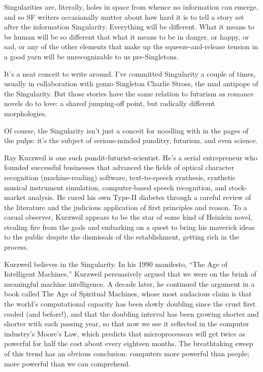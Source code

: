 Singularities are, literally, holes in space from whence no
information can emerge, and so SF writers occasionally mutter about
how hard it is to tell a story set after the information
Singularity. Everything will be different. What it means to be
human will be so different that what it means to be in danger, or
happy, or sad, or any of the other elements that make up the
squeeze-and-release tension in a good yarn will be unrecognizable
to us pre-Singletons.

It's a neat conceit to write around. I've committed Singularity a
couple of times, usually in collaboration with gonzo Singleton
Charlie Stross, the mad antipope of the Singularity. But those
stories have the same relation to futurism as romance novels do to
love: a shared jumping-off point, but radically different
morphologies.

Of course, the Singularity isn't just a conceit for noodling with
in the pages of the pulps: it's the subject of serious-minded
punditry, futurism, and even science.

Ray Kurzweil is one such pundit-futurist-scientist. He's a serial
entrepreneur who founded successful businesses that advanced the
fields of optical character recognition (machine-reading) software,
text-to-speech synthesis, synthetic musical instrument simulation,
computer-based speech recognition, and stock-market analysis. He
cured his own Type-II diabetes through a careful review of the
literature and the judicious application of first principles and
reason. To a casual observer, Kurzweil appears to be the star of
some kind of Heinlein novel, stealing fire from the gods and
embarking on a quest to bring his maverick ideas to the public
despite the dismissals of the establishment, getting rich in the
process.

Kurzweil believes in the Singularity. In his 1990 manifesto, ``The
Age of Intelligent Machines,'' Kurzweil persuasively argued that we
were on the brink of meaningful machine intelligence. A decade
later, he continued the argument in a book called The Age of
Spiritual Machines, whose most audacious claim is that the world's
computational capacity has been slowly doubling since the crust
first cooled (and before!), and that the doubling interval has been
growing shorter and shorter with each passing year, so that now we
see it reflected in the computer industry's Moore's Law, which
predicts that microprocessors will get twice as powerful for half
the cost about every eighteen months. The breathtaking sweep of
this trend has an obvious conclusion: computers more powerful than
people; more powerful than we can comprehend.

